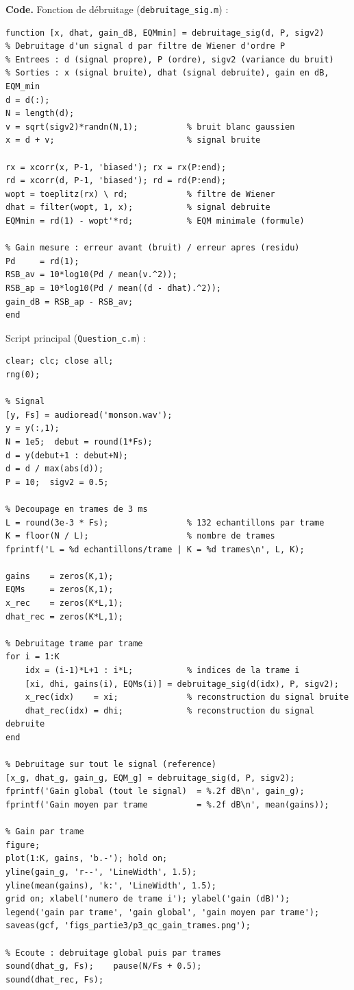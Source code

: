 \textbf{Code.} Fonction de débruitage (\texttt{debruitage\_sig.m}) :
\begin{lstlisting}
function [x, dhat, gain_dB, EQMmin] = debruitage_sig(d, P, sigv2)
% Debruitage d'un signal d par filtre de Wiener d'ordre P
% Entrees : d (signal propre), P (ordre), sigv2 (variance du bruit)
% Sorties : x (signal bruite), dhat (signal debruite), gain en dB, EQM_min
d = d(:);
N = length(d);
v = sqrt(sigv2)*randn(N,1);          % bruit blanc gaussien
x = d + v;                           % signal bruite

rx = xcorr(x, P-1, 'biased'); rx = rx(P:end);
rd = xcorr(d, P-1, 'biased'); rd = rd(P:end);
wopt = toeplitz(rx) \ rd;            % filtre de Wiener
dhat = filter(wopt, 1, x);           % signal debruite
EQMmin = rd(1) - wopt'*rd;           % EQM minimale (formule)

% Gain mesure : erreur avant (bruit) / erreur apres (residu)
Pd     = rd(1);
RSB_av = 10*log10(Pd / mean(v.^2));
RSB_ap = 10*log10(Pd / mean((d - dhat).^2));
gain_dB = RSB_ap - RSB_av;
end
\end{lstlisting}

Script principal (\texttt{Question\_c.m}) :
\begin{lstlisting}
clear; clc; close all;
rng(0);

% Signal
[y, Fs] = audioread('monson.wav');
y = y(:,1);
N = 1e5;  debut = round(1*Fs);
d = y(debut+1 : debut+N);
d = d / max(abs(d));
P = 10;  sigv2 = 0.5;

% Decoupage en trames de 3 ms
L = round(3e-3 * Fs);                % 132 echantillons par trame
K = floor(N / L);                    % nombre de trames
fprintf('L = %d echantillons/trame | K = %d trames\n', L, K);

gains    = zeros(K,1);
EQMs     = zeros(K,1);
x_rec    = zeros(K*L,1);
dhat_rec = zeros(K*L,1);

% Debruitage trame par trame
for i = 1:K
    idx = (i-1)*L+1 : i*L;           % indices de la trame i
    [xi, dhi, gains(i), EQMs(i)] = debruitage_sig(d(idx), P, sigv2);
    x_rec(idx)    = xi;              % reconstruction du signal bruite
    dhat_rec(idx) = dhi;             % reconstruction du signal debruite
end

% Debruitage sur tout le signal (reference)
[x_g, dhat_g, gain_g, EQM_g] = debruitage_sig(d, P, sigv2);
fprintf('Gain global (tout le signal)  = %.2f dB\n', gain_g);
fprintf('Gain moyen par trame          = %.2f dB\n', mean(gains));

% Gain par trame
figure;
plot(1:K, gains, 'b.-'); hold on;
yline(gain_g, 'r--', 'LineWidth', 1.5);
yline(mean(gains), 'k:', 'LineWidth', 1.5);
grid on; xlabel('numero de trame i'); ylabel('gain (dB)');
legend('gain par trame', 'gain global', 'gain moyen par trame');
saveas(gcf, 'figs_partie3/p3_qc_gain_trames.png');

% Ecoute : debruitage global puis par trames
sound(dhat_g, Fs);    pause(N/Fs + 0.5);
sound(dhat_rec, Fs);
\end{lstlisting}

